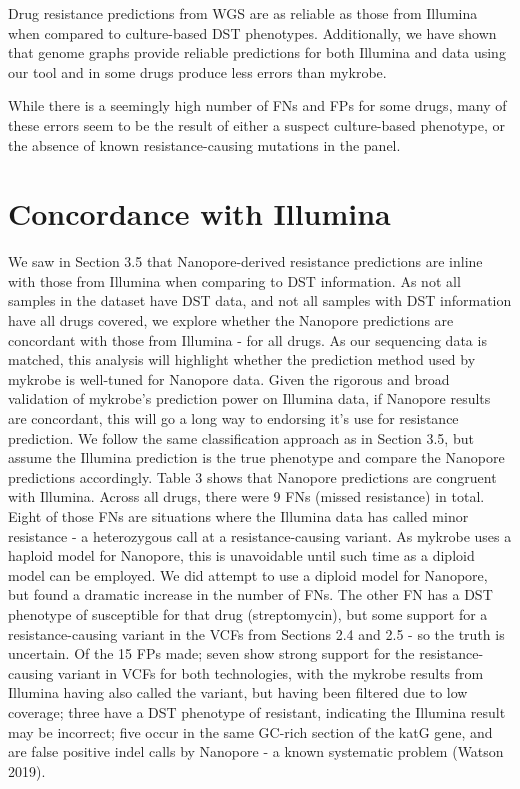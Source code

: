 Drug resistance predictions from \ont{} WGS are as reliable as those from Illumina when compared to culture-based DST phenotypes. Additionally, we have shown that genome graphs provide reliable predictions for both Illumina and \ont{} data using our tool \drprg{} and in some drugs produce less errors than mykrobe.

While there is a seemingly high number of FNs and FPs for some drugs, many of these errors seem to be the result of either a suspect culture-based phenotype, or the absence of known resistance-causing mutations in the panel.

\section{Concordance with Illumina}
\label{sec:geno-concordance}
We saw in Section 3.5 that Nanopore-derived resistance predictions are inline with those from Illumina when comparing to DST information. As not all samples in the dataset have DST data, and not all samples with DST information have all drugs covered, we explore whether the Nanopore predictions are concordant with those from Illumina - for all drugs. As our sequencing data is matched, this analysis will highlight whether the prediction method used by mykrobe is well-tuned for Nanopore data. Given the rigorous and broad validation of mykrobe's prediction power on Illumina data, if Nanopore results are concordant, this will go a long way to endorsing it's use for resistance prediction.
We follow the same classification approach as in Section 3.5, but assume the Illumina prediction is the true phenotype and compare the Nanopore predictions accordingly. Table 3 shows that Nanopore predictions are congruent with Illumina.
Across all drugs, there were 9 FNs (missed resistance) in total. Eight of those FNs are situations where the Illumina data has called minor resistance - a heterozygous call at a resistance-causing variant. As mykrobe uses a haploid model for Nanopore, this is unavoidable until such time as a diploid model can be employed. We did attempt to use a diploid model for Nanopore, but found a dramatic increase in the number of FNs. The other FN has a DST phenotype of susceptible for that drug (streptomycin), but some support for a resistance-causing variant in the VCFs from Sections 2.4 and 2.5 - so the truth is uncertain.
Of the 15 FPs made; seven show strong support for the resistance-causing variant in VCFs for both technologies, with the mykrobe results from Illumina having also called the variant, but having been filtered due to low coverage;  three have a DST phenotype of resistant, indicating the Illumina result may be incorrect; five occur in the same GC-rich section of the katG gene, and are false positive indel calls by Nanopore - a known systematic problem (Watson 2019).

